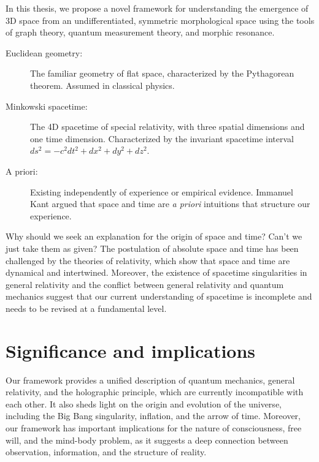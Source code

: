 In this thesis, we propose a novel framework for understanding the emergence of 3D space from an undifferentiated, symmetric morphological space using the tools of graph theory, quantum measurement theory, and morphic resonance.

\begin{tcolorbox}[colback=blue!5!white,colframe=blue!75!black,title=New terms]
    \begin{description}
        \item[Euclidean geometry:] The familiar geometry of flat space, characterized by the Pythagorean theorem. Assumed in classical physics.
        \item[Minkowski spacetime:] The 4D spacetime of special relativity, with three spatial dimensions and one time dimension. Characterized by the invariant spacetime interval $ds^2 = -c^2 dt^2 + dx^2 + dy^2 + dz^2$.
        \item[A priori:] Existing independently of experience or empirical evidence. Immanuel Kant argued that space and time are \textit{a priori} intuitions that structure our experience.
    \end{description}
\end{tcolorbox}

\begin{tcolorbox}[colback=green!5!white,colframe=green!75!black,title=Question]
    Why should we seek an explanation for the origin of space and time? Can't we just take them as given?
    \tcblower
    The postulation of absolute space and time has been challenged by the theories of relativity, which show that space and time are dynamical and intertwined. Moreover, the existence of spacetime singularities in general relativity and the conflict between general relativity and quantum mechanics suggest that our current understanding of spacetime is incomplete and needs to be revised at a fundamental level.
\end{tcolorbox}

\section{Significance and implications}
Our framework provides a unified description of quantum mechanics, general relativity, and the holographic principle, which are currently incompatible with each other. It also sheds light on the origin and evolution of the universe, including the Big Bang singularity, inflation, and the arrow of time. Moreover, our framework has important implications for the nature of consciousness, free will, and the mind-body problem, as it suggests a deep connection between observation, information, and the structure of reality.

